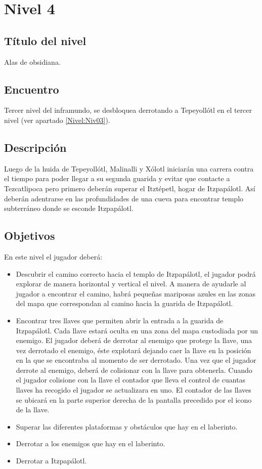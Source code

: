\section{Nivel 4} \label{Nivel:Niv04}
        \subsection{Título del nivel}
        Alas de obsidiana.
        \subsection{Encuentro}
Tercer nivel del inframundo, se desbloquea derrotando a Tepeyollótl en el tercer nivel (ver apartado \ref{Nivel:Niv03}).
        \subsection{Descripción}
        Luego de la huida de Tepeyollótl, Malinalli y Xólotl iniciarán una carrera contra el tiempo para poder llegar a su segunda guarida y evitar que contacte a Tezcatlipoca pero primero deberán superar el Itztépetl, hogar de Itzpapálotl. Así deberán adentrarse en las profundidades de una cueva para encontrar templo subterráneo donde se esconde Itzpapálotl. 
        \subsection{Objetivos}
En este nivel el jugador deberá:        
\begin{itemize}
        \item Descubrir el camino correcto hacia el templo de Itzpapálotl, el jugador podrá explorar de manera horizontal y vertical el nivel. A manera de ayudarle al jugador a encontrar el camino, habrá pequeñas mariposas azules en las zonas del mapa que correspondan al camino hacia la guarida de Itzpapálotl. 
        \item Encontrar tres llaves que permiten abrir la entrada a la guarida de Itzpapálotl. Cada llave estará oculta en una zona del mapa custodiada por un enemigo. El jugador deberá de derrotar al enemigo que protege la llave, una vez derrotado el enemigo, éste explotará dejando caer la llave en la posición en la que se encontraba al momento de ser derrotado. Una vez que el jugador derrote al enemigo, deberá de colisionar con la llave para obtenerla. Cuando el jugador colisione con la llave el contador que lleva el control de cuantas llaves ha recogido el jugador se actualizara en uno. El contador de las llaves se ubicará en la parte superior derecha de la pantalla precedido por el icono de la llave. 
        \item Superar las diferentes plataformas y obstáculos que hay en el laberinto. 
        \item Derrotar a los enemigos que hay en el laberinto.
        \item Derrotar a Itzpapálotl.
\end{itemize}
